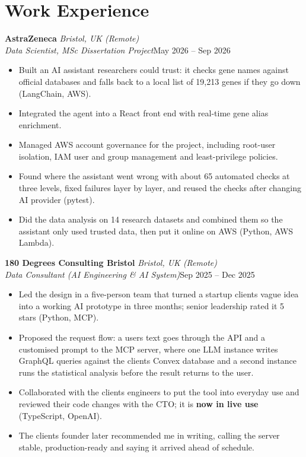 \documentclass[a4paper,11pt]{article}
\newcommand{\role}[4]{%
  \textbf{#1}{\color{muted}\,\textperiodcentered\,\textit{#2}}\\
  \textit{#4}\hfill{\color{muted}#3}\par}
\newcommand{\gap}{\vspace{5pt}}
\newcommand{\num}[1]{\textbf{#1}}   %
\begin{document}
\section{Work Experience}
\role{AstraZeneca}{Bristol, UK (Remote)}{May 2026 – Sep 2026}{Data Scientist, MSc Dissertation Project}
\begin{itemize}
  \item Built an AI assistant researchers could trust: it checks gene names against official databases and falls back to a local list of 19,213 genes if they go down (LangChain, AWS).
  \item Integrated the agent into a React front end with real-time gene alias enrichment.
  \item Managed AWS account governance for the project, including root-user isolation, IAM user and group management and least-privilege policies.
  \item Found where the assistant went wrong with about 65 automated checks at three levels, fixed failures layer by layer, and reused the checks after changing AI provider (pytest).
  \item Did the data analysis on 14 research datasets and combined them so the assistant only used trusted data, then put it online on AWS (Python, AWS Lambda).
\end{itemize}
\gap
{}
\role{180 Degrees Consulting Bristol}{Bristol, UK (Remote)}{Sep 2025 – Dec 2025}{Data Consultant (AI Engineering \& AI System)}
\begin{itemize}
  \item Led the design in a five-person team that turned a startup client\textquotesingle{}s vague idea into a working AI prototype in three months; senior leadership rated it 5 stars (Python, MCP).
  \item Proposed the request flow: a user\textquotesingle{}s text goes through the API and a customised prompt to the MCP server, where one LLM instance writes GraphQL queries against the client\textquotesingle{}s Convex database and a second instance runs the statistical analysis before the result returns to the user.
  \item Collaborated with the client\textquotesingle{}s engineers to put the tool into everyday use and reviewed their code changes with the CTO; it is \num{now in live use} (TypeScript, OpenAI).
  \item The client\textquotesingle{}s founder later recommended me in writing, calling the server \textquotesingle{}stable, production-ready\textquotesingle{} and saying it arrived ahead of schedule.
\end{itemize}
\end{document}
